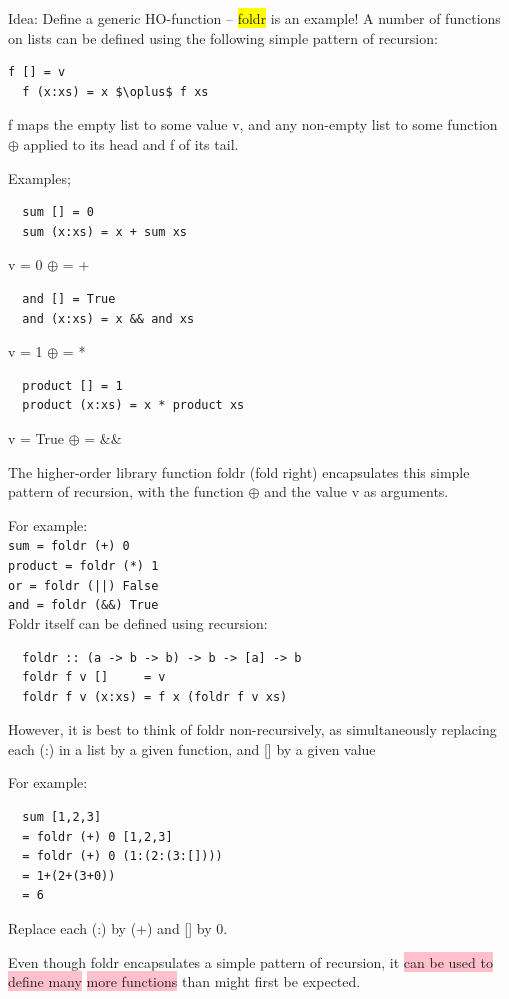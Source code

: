 \documentclass[tikz,border=10pt]{project_plan}
\begin{document}
Idea: Define a generic HO-function – \colorbox{yellow}{foldr} is an example!
A number of functions on lists can be defined using the
following simple pattern of recursion:
\begin{lstlisting}[mathescape]
  f [] = v
  f (x:xs) = x $\oplus$ f xs
\end{lstlisting}
f maps the empty list to some value v, and any
non-empty list to some function $\oplus$ applied to its
head and f of its tail.

Examples;
\begin{lstlisting}
  sum [] = 0
  sum (x:xs) = x + sum xs
\end{lstlisting}
v = 0    $\oplus$ = +
\begin{lstlisting}
  and [] = True
  and (x:xs) = x && and xs
\end{lstlisting}
v = 1    $\oplus$ = *
\begin{lstlisting}
  product [] = 1
  product (x:xs) = x * product xs
\end{lstlisting}
v = True    $\oplus$ = \&\&

The higher-order library function foldr (fold right)
encapsulates this simple pattern of recursion, with the
function $\oplus$ and the value v as arguments.

For example:\\
\lstinline?sum = foldr (+) 0?\\
\lstinline?product = foldr (*) 1?\\
\lstinline?or = foldr (||) False?\\
\lstinline?and = foldr (&&) True?\\

Foldr itself can be defined using recursion:
\begin{lstlisting}
  foldr :: (a -> b -> b) -> b -> [a] -> b
  foldr f v []     = v
  foldr f v (x:xs) = f x (foldr f v xs)
\end{lstlisting}

However, it is best to think of foldr non-recursively, as
simultaneously replacing each (:) in a list by a given
function, and [] by a given value

For example:\\
\begin{lstlisting}
  sum [1,2,3]
  = foldr (+) 0 [1,2,3]
  = foldr (+) 0 (1:(2:(3:[])))
  = 1+(2+(3+0))
  = 6
\end{lstlisting}
Replace each (:) by (+) and [] by 0.

Even though foldr encapsulates a simple pattern of
recursion, it \colorbox{pink}{can be used to define many} \colorbox{pink}{more functions}
than might first be expected.
\end{document}
